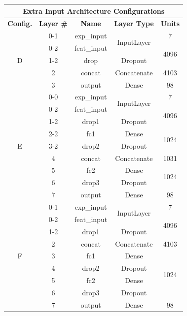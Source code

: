 \begin{table}[h!]
\begin{center}
\begin{tabular}{|c|c|c|c|c|}
\hline
\multicolumn{5}{|c|}{Extra Input Architecture Configurations} \\ \hline
\textbf{Config.} & \textbf{Layer \#} & \textbf{Name} & \textbf{Layer Type} & \textbf{Units} \\ \hline
\multirow{5}{*}{D} & 0-1 & exp\_input & \multirow{2}{*}{InputLayer} & 7 \\ \cline{2-3} \cline{5-5}
 & 0-2 & feat\_input & & \multirow{2}{*}{4096} \\ \cline{2-4}
 & 1-2 & drop & Dropout & \\ \cline{2-5}
 & 2 & concat & Concatenate & 4103 \\ \cline{2-5}
 & 3 & output & Dense & 98 \\ \hline
\multirow{9}{*}{E} & 0-0 & exp\_input & \multirow{2}{*}{InputLayer} & 7 \\ \cline{2-3} \cline{5-5}
 & 0-2 & feat\_input & & \multirow{2}{*}{4096} \\ \cline{2-4}
 & 1-2 & drop1 & Dropout & \\ \cline{2-5}
 & 2-2 & fc1 & Dense & \multirow{2}{*}{1024} \\ \cline{2-4}
 & 3-2 & drop2 & Dropout & \\ \cline{2-5}
 & 4 & concat & Concatenate & 1031 \\ \cline{2-5}
 & 5 & fc2 & Dense & \multirow{2}{*}{1024} \\ \cline{2-4}
 & 6 & drop3 & Dropout & \\ \cline{2-5}
 & 7 & output & Dense & 98 \\ \hline
\multirow{9}{*}{F} & 0-1 & exp\_input & \multirow{2}{*}{InputLayer} & 7 \\ \cline{2-3} \cline{5-5}
 & 0-2 & feat\_input & & \multirow{2}{*}{4096} \\ \cline{2-4}
 & 1-2 & drop1 & Dropout & \\ \cline{2-5}
 & 2 & concat & Concatenate & 4103 \\ \cline{2-5}
 & 3 & fc1 & Dense & \multirow{4}{*}{1024} \\ \cline{2-4}
 & 4 & drop2 & Dropout & \\ \cline{2-4}
 & 5 & fc2 & Dense & \\ \cline{2-4}
 & 6 & drop3 & Dropout & \\ \cline{2-5}
 & 7 & output & Dense & 98 \\ \hline 

\end{tabular}
\end{center}
\end{table}
